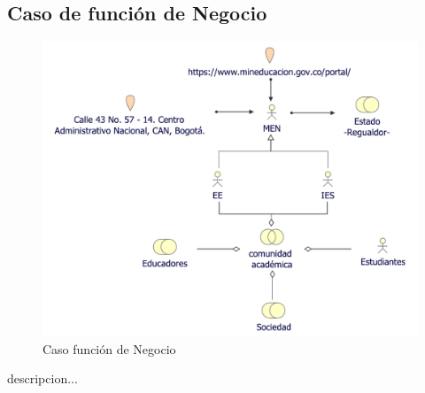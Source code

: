 \subsection{Caso  de función de Negocio}
\begin{figure}[h!]
	\centering
	\includegraphics[width=.9\linewidth]{imgs/caso/negocio/organizacion}
	\caption{Caso función de Negocio}
\end{figure}
descripcion...
